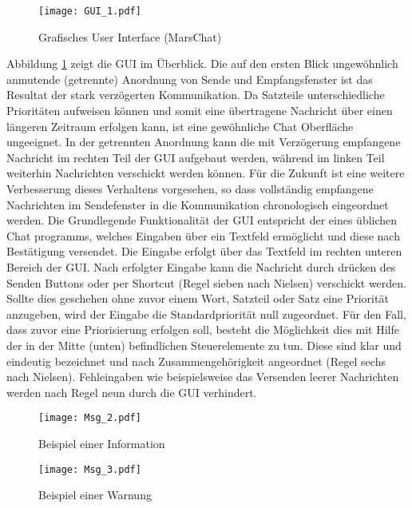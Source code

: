\begin{figure}[H]
\centering
\texttt{[image: GUI\_1.pdf]}
\caption{Grafisches User Interface (MarsChat)}
\label{fig:GUI}
\end{figure}

Abbildung \ref{fig:GUI} zeigt die GUI im {\"U}berblick. Die auf den
ersten Blick ungew{\"o}hnlich anmutende (getrennte) Anordnung von Sende und
Empfangsfenster ist das Resultat der stark verz{\"o}gerten Kommunikation. Da
Satzteile unterschiedliche Priorit{\"a}ten aufweisen k{\"o}nnen und somit eine
{\"u}bertragene Nachricht {\"u}ber einen l{\"a}ngeren Zeitraum erfolgen kann,
ist eine gew{\"o}hnliche Chat Oberfl{\"a}che ungeeignet. In der getrennten
Anordnung kann die mit Verz{\"o}gerung empfangene Nachricht im rechten Teil der
GUI aufgebaut werden, w{\"a}hrend im linken Teil weiterhin Nachrichten
verschickt werden k{\"o}nnen. F{\"u}r die Zukunft ist eine weitere Verbesserung dieses
Verhaltens vorgesehen, so dass vollst{\"a}ndig empfangene Nachrichten im
Sendefenster in die Kommunikation chronologisch eingeordnet werden. Die
Grundlegende Funktionalit{\"a}t der GUI entspricht der eines {\"u}blichen Chat
programms, welches Eingaben {\"u}ber ein Textfeld erm{\"o}glicht und diese nach
Best{\"a}tigung versendet. Die Eingabe erfolgt {\"u}ber das Textfeld im rechten unteren
Bereich der GUI. Nach erfolgter Eingabe kann die Nachricht durch dr{\"u}cken des
Senden Buttons oder per Shortcut (Regel sieben nach Nielsen) verschickt werden.
Sollte dies geschehen ohne zuvor einem Wort, Satzteil oder Satz eine
Priorit{\"a}t anzugeben, wird der Eingabe die Standardpriorit{\"a}t null
zugeordnet. F{\"u}r den Fall, dass zuvor eine Priorisierung erfolgen soll,
besteht die M{\"o}glichkeit dies mit Hilfe der in der Mitte (unten) befindlichen
Steuerelemente zu tun. Diese sind klar und eindeutig bezeichnet und nach
Zusammengeh{\"o}rigkeit angeordnet (Regel sechs nach Nielsen). Fehleingaben wie
beispielsweise das Versenden leerer Nachrichten werden nach Regel neun durch die
GUI verhindert. 

\begin{figure}[H]
\centering
\texttt{[image: Msg\_2.pdf]}
\caption{Beispiel einer Information}
\label{fig:Msg2}
\end{figure}

\begin{figure}[H]
\centering
\texttt{[image: Msg\_3.pdf]}
\caption{Beispiel einer Warnung}
\label{fig:Msg3}
\end{figure}

